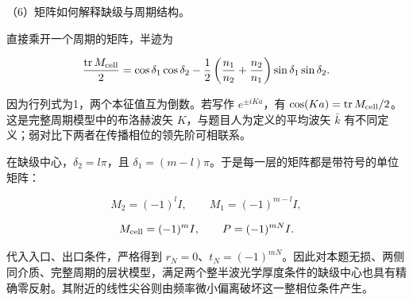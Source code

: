 \documentclass[12pt,a4paper,fontset=fandol]{ctexart}
\begin{document}
\par\noindent\begin{minipage}{\linewidth}
\setlength{\parindent}{2em}\setlength{\parskip}{.35em}
（6）矩阵如何解释缺级与周期结构。

直接乘开一个周期的矩阵，半迹为

\[
\frac{\operatorname{tr}M_{\rm cell}}2
=\cos\delta_1\cos\delta_2
-\frac12\left(\frac{n_1}{n_2}+\frac{n_2}{n_1}\right)
\sin\delta_1\sin\delta_2.
\]

因为行列式为1，两个本征值互为倒数。若写作 \(e^{\pm iKa}\)，有
\(\cos(Ka)=\operatorname{tr}M_{\rm cell}/2\)。这是完整周期模型中的布洛赫波矢
\(K\)，与题目人为定义的平均波矢 \(\bar k\)
有不同定义；弱对比下两者在传播相位的领先阶可相联系。

在缺级中心，\(\delta_2=l\pi\)，且
\(\delta_1=(m-l)\pi\)。于是每一层的矩阵都是带符号的单位矩阵：

\[
M_2=(-1)^lI,\qquad M_1=(-1)^{m-l}I,
\]

\[
M_{\rm cell}=(-1)^mI,\qquad P=(-1)^{mN}I.
\]

代入入口、出口条件，严格得到
\(r_N=0\)、\(t_N=(-1)^{mN}\)。因此对本题无损、两侧同介质、完整周期的层状模型，满足两个整半波光学厚度条件的缺级中心也具有精确零反射。其附近的线性尖谷则由频率微小偏离破坏这一整相位条件产生。

\end{minipage}\par
\end{document}
